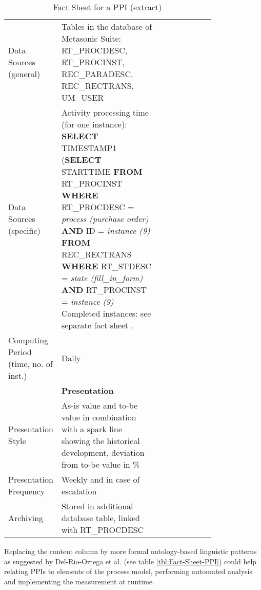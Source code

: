 \begin{table}[htbp]
\begin{tabular}[t]{@{}l p{0.5\linewidth} p{0.3\linewidth} @{}}
		\\
		Data Sources (general) & Tables in the database of Metasonic Suite:
		RT\_PROCDESC, RT\_PROCINST, REC\_PARADESC, REC\_RECTRANS, UM\_USER
		\\
		Data Sources (specific) & Activity processing time (for one instance):\newline
		\textbf{SELECT} TIMESTAMP1  \newline
		(\textbf{SELECT} STARTTIME \newline
		\textbf{FROM} RT\_PROCINST \newline
		\textbf{WHERE} RT\_PROCDESC = \textit{process (purchase order)}\newline
		\textbf{AND} ID = \textit{instance (9)}\newline
		\textbf{FROM} REC\_RECTRANS\newline
		\textbf{WHERE} RT\_STDESC = \textit{\textit{state (fill\_in\_form)}}\newline
		\textbf{AND} RT\_PROCINST = \textit{instance (9)}
		Completed instances: see separate fact sheet .
		\\
		Computing Period (time, no. of inst.) & Daily
		\\
		& \textbf{Presentation}
		\\
		Presentation Style & As-is value and to-be value in combination with a spark line showing the historical development, deviation from to-be value in \%
		\\
		Presentation Frequency & Weekly and in case of escalation
		\\
		Archiving & Stored in additional database table, linked with RT\_PROCDESC
		\\

\bottomrule
\end{tabular}
\caption{Fact Sheet for a PPI (extract)}
\label{tbl:Fact-Sheet}
\end{table}

Replacing the content column by more formal ontology-based linguistic patterns as suggested by Del-Rio-Ortega et al. (see table \ref{tbl:Fact-Sheet-PPI}) could help relating PPIs to elements of the process model, performing automated analysis \cite{article:ProcessPerfInd} and implementing the measurement at runtime.

